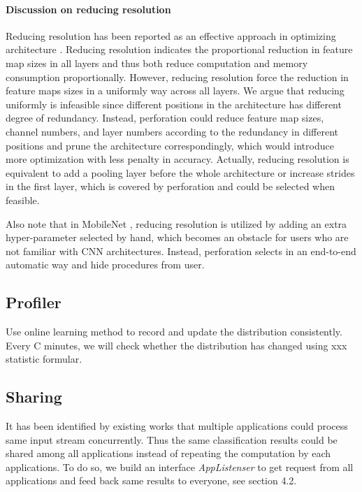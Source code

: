 \documentclass[pageno]{jpaper}
\begin{document}
\paragraph{Discussion on reducing resolution}
Reducing resolution has been reported as an effective approach in optimizing architecture \cite{krizhevsky2009learning, fu2017look, howard2017mobilenets}. Reducing resolution indicates the proportional reduction in feature map sizes in all layers and thus both reduce computation and memory consumption proportionally. However, reducing resolution force the reduction in feature maps sizes in a uniformly way across all layers. We argue that reducing uniformly is infeasible since different positions in the architecture has different degree of redundancy. Instead, perforation could reduce feature map sizes, channel numbers, and layer numbers according to the redundancy in different positions and prune the architecture correspondingly, which would introduce more optimization with less penalty in accuracy. Actually, reducing resolution is equivalent to add a pooling layer before the whole architecture or increase strides in the first layer, which is covered by perforation and could be selected when feasible.

Also note that in MobileNet \cite{howard2017mobilenets}, reducing resolution is utilized by adding an extra hyper-parameter selected by hand, which becomes an obstacle for users who are not familiar with CNN architectures. Instead, perforation selects in an end-to-end automatic way and hide procedures from user.



\subsection{Profiler}
Use online learning method to record and update the distribution consistently. Every C minutes, we will check whether the distribution has changed using xxx statistic formular.

\subsection{Sharing}
It has been identified by existing works that multiple applications could process same input stream concurrently. Thus the same classification results could be shared among all applications instead of repeating the computation by each applications. To do so, we build an interface \textit{AppListenser} to get request from all applications and feed back same results to everyone, see section 4.2.
\end{document}
